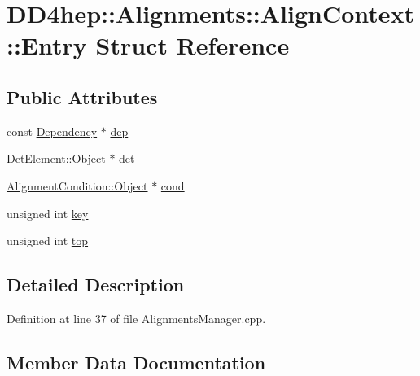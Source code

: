 \hypertarget{struct_d_d4hep_1_1_alignments_1_1_align_context_1_1_entry}{}\section{D\+D4hep\+:\+:Alignments\+:\+:Align\+Context\+:\+:Entry Struct Reference}
\label{struct_d_d4hep_1_1_alignments_1_1_align_context_1_1_entry}
\subsection*{Public Attributes}
\begin{DoxyCompactItemize}
\item 
const \hyperlink{namespace_d_d4hep_1_1_alignments_a94aaf200a47dbbcf42c8769eb623ea60}{Dependency} $\ast$ \hyperlink{struct_d_d4hep_1_1_alignments_1_1_align_context_1_1_entry_a9e19872212429d2e48675c52c480aa35}{dep}
\item 
\hyperlink{class_d_d4hep_1_1_geometry_1_1_det_element_a4e44e860d6e5827d9f42a4aea3a4f288}{Det\+Element\+::\+Object} $\ast$ \hyperlink{struct_d_d4hep_1_1_alignments_1_1_align_context_1_1_entry_a746553aaf4056ce6511a17c7929dde44}{det}
\item 
\hyperlink{class_d_d4hep_1_1_alignments_1_1_alignment_condition_aad9d743ab04b8eb38063249c6a9e16c0}{Alignment\+Condition\+::\+Object} $\ast$ \hyperlink{struct_d_d4hep_1_1_alignments_1_1_align_context_1_1_entry_ab3e3d013e2e3b3d978f38a1f32d806da}{cond}
\item 
unsigned int \hyperlink{struct_d_d4hep_1_1_alignments_1_1_align_context_1_1_entry_a11ecca8923ec80803028766427ce25eb}{key}
\item 
unsigned int \hyperlink{struct_d_d4hep_1_1_alignments_1_1_align_context_1_1_entry_aa5d088f1704ee169e740e841721f2b2e}{top}
\end{DoxyCompactItemize}


\subsection{Detailed Description}


Definition at line 37 of file Alignments\+Manager.\+cpp.



\subsection{Member Data Documentation}
\hypertarget{struct_d_d4hep_1_1_alignments_1_1_align_context_1_1_entry_ab3e3d013e2e3b3d978f38a1f32d806da}{}\label{struct_d_d4hep_1_1_alignments_1_1_align_context_1_1_entry_ab3e3d013e2e3b3d978f38a1f32d806da} 
